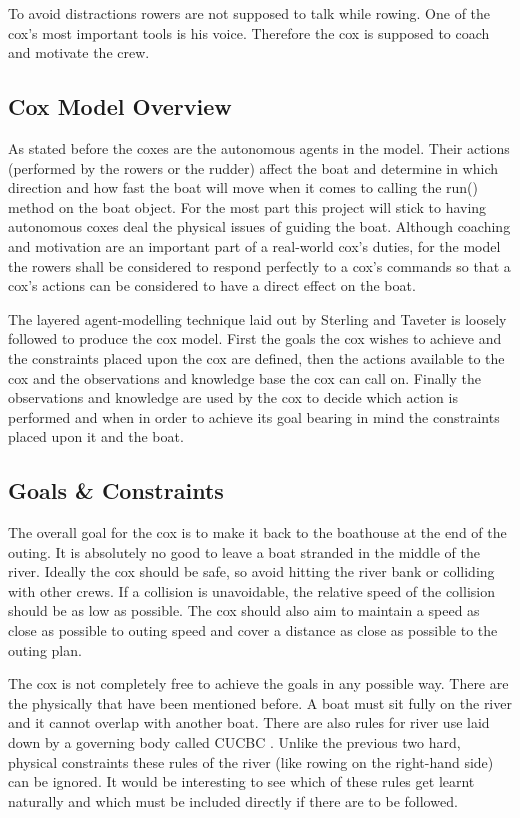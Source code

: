       To avoid distractions rowers are not supposed to talk while rowing. One of the cox's most important tools is his voice. Therefore the cox is supposed to coach and motivate the crew.
      
      \subsection{Cox Model Overview}
      As stated before the coxes are the autonomous agents in the model. Their actions (performed by the rowers or the rudder) affect the boat and determine in which direction and how fast the boat will move when it comes to calling the run() method on the boat object. For the most part this project will stick to having autonomous coxes deal the physical issues of guiding the boat. Although coaching and motivation are an important part of a real-world cox's duties, for the model the rowers shall be considered to respond perfectly to a cox's commands so that a cox's actions can be considered to have a direct effect on the boat.
      
      The layered agent-modelling technique laid out by Sterling and Taveter \cite{Sterling2009} is loosely followed to produce the cox model. First the goals the cox wishes to achieve and the constraints placed upon the cox are defined, then the actions available to the cox and the observations and knowledge base the cox can call on. Finally the observations and knowledge are used by the cox to decide which action is performed and when in order to achieve its goal bearing in mind the constraints placed upon it and the boat.

      \subsection{Goals \& Constraints}
      The overall goal for the cox is to make it back to the boathouse at the end of the outing. It is absolutely no good to leave a boat stranded in the middle of the river. Ideally the cox should be safe, so avoid hitting the river bank or colliding with other crews. If a collision is unavoidable, the relative speed of the collision should be as low as possible. The cox should also aim to maintain a speed as close as possible to outing speed and cover a distance as close as possible to the outing plan.
      
      The cox is not completely free to achieve the goals in any possible way. There are the physically that have been mentioned before. A boat must sit fully on the river and it cannot overlap with another boat. There are also rules for river use laid down by a governing body called CUCBC \cite{CUCBC}. Unlike the previous two hard, physical constraints these rules of the river (like rowing on the right-hand side) can be ignored. It would be interesting to see which of these rules get learnt naturally and which must be included directly if there are to be followed.
      
